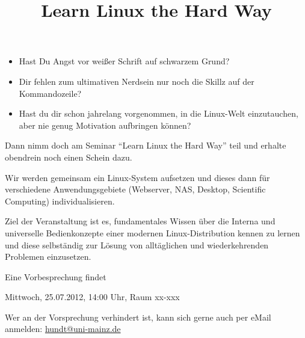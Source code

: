 \documentclass[a4paper]{article}
\title{\phantomsection%
  Learn Linux the Hard Way%
  \label{learn-linux-the-hard-way}}
\author{}
\date{}
\begin{document}
\maketitle
%
\begin{itemize}

\item Hast Du Angst vor weißer Schrift auf schwarzem Grund?

\item Dir fehlen zum ultimativen Nerdsein nur noch die Skillz auf der  Kommandozeile?

\item Hast du dir schon jahrelang vorgenommen, in die Linux-Welt einzutauchen, aber nie genug Motivation aufbringen können?

\end{itemize}

Dann nimm doch am Seminar ``Learn Linux the Hard Way'' teil und erhalte obendrein noch einen Schein dazu.

Wir werden gemeinsam ein Linux-System aufsetzen und dieses dann für verschiedene Anwendungsgebiete (Webserver, NAS, Desktop, Scientific Computing) individualisieren.

Ziel der Veranstaltung ist es, fundamentales Wissen über die Interna und universelle Bedienkonzepte einer modernen Linux-Distribution kennen zu lernen und diese selbständig zur Lösung von alltäglichen und wiederkehrenden Problemen einzusetzen.

Eine Vorbesprechung findet

Mittwoch, 25.07.2012, 14:00 Uhr, Raum xx-xxx

Wer an der Vorsprechung verhindert ist, kann sich gerne auch per eMail anmelden: \href{mailto:hundt@uni-mainz.de}{hundt@uni-mainz.de}
\end{document}
